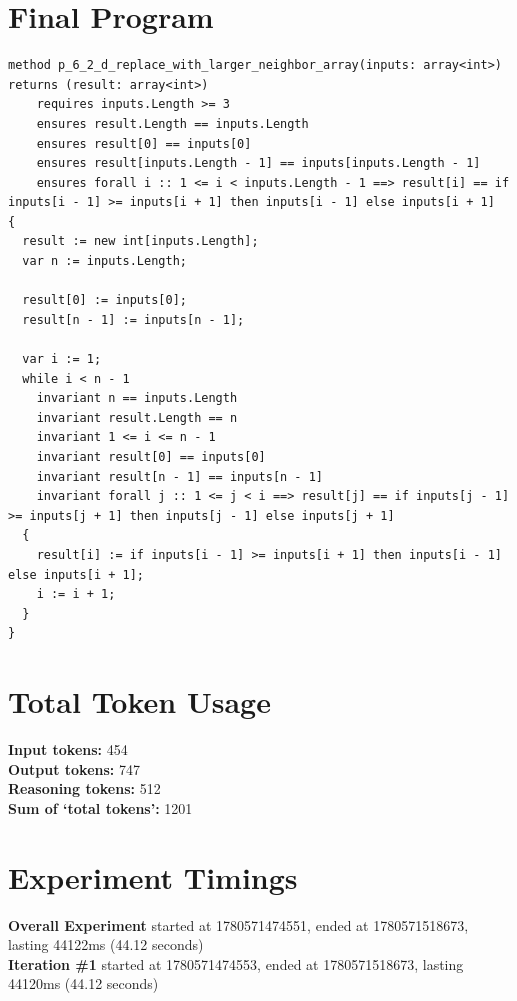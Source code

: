 \documentclass{article}
\begin{document}
\section*{Final Program}
\begin{lstlisting}
method p_6_2_d_replace_with_larger_neighbor_array(inputs: array<int>) returns (result: array<int>)
	requires inputs.Length >= 3
	ensures result.Length == inputs.Length
	ensures result[0] == inputs[0]
	ensures result[inputs.Length - 1] == inputs[inputs.Length - 1]
	ensures forall i :: 1 <= i < inputs.Length - 1 ==> result[i] == if inputs[i - 1] >= inputs[i + 1] then inputs[i - 1] else inputs[i + 1]
{
  result := new int[inputs.Length];
  var n := inputs.Length;

  result[0] := inputs[0];
  result[n - 1] := inputs[n - 1];

  var i := 1;
  while i < n - 1
    invariant n == inputs.Length
    invariant result.Length == n
    invariant 1 <= i <= n - 1
    invariant result[0] == inputs[0]
    invariant result[n - 1] == inputs[n - 1]
    invariant forall j :: 1 <= j < i ==> result[j] == if inputs[j - 1] >= inputs[j + 1] then inputs[j - 1] else inputs[j + 1]
  {
    result[i] := if inputs[i - 1] >= inputs[i + 1] then inputs[i - 1] else inputs[i + 1];
    i := i + 1;
  }
}
\end{lstlisting}
\section*{Total Token Usage}
\textbf{Input tokens: }454
\\\textbf{Output tokens: }747
\\\textbf{Reasoning tokens: }512
\\\textbf{Sum of `total tokens': }1201
\section*{Experiment Timings}
\textbf{Overall Experiment} started at 1780571474551, ended at 1780571518673, lasting 44122ms (44.12 seconds)
\\\textbf{Iteration \#1} started at 1780571474553, ended at 1780571518673, lasting 44120ms (44.12 seconds)
\end{document}

